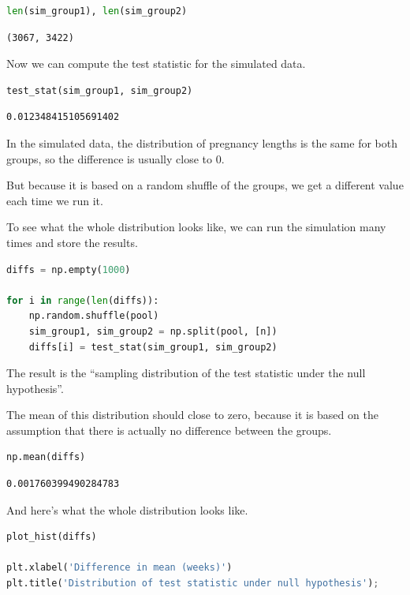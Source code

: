 \begin{lstlisting}[language=Python,style=source]
len(sim_group1), len(sim_group2)
\end{lstlisting}

\begin{lstlisting}[style=output]
(3067, 3422)
\end{lstlisting}

Now we can compute the test statistic for the simulated data.

\begin{lstlisting}[language=Python,style=source]
test_stat(sim_group1, sim_group2)
\end{lstlisting}

\begin{lstlisting}[style=output]
0.012348415105691402
\end{lstlisting}

In the simulated data, the distribution of pregnancy lengths is the same
for both groups, so the difference is usually close to 0.

But because it is based on a random shuffle of the groups, we get a
different value each time we run it.

To see what the whole distribution looks like, we can run the simulation
many times and store the results.

\begin{lstlisting}[language=Python,style=source]
diffs = np.empty(1000)

for i in range(len(diffs)):
    np.random.shuffle(pool)
    sim_group1, sim_group2 = np.split(pool, [n])
    diffs[i] = test_stat(sim_group1, sim_group2)
\end{lstlisting}

The result is the ``sampling distribution of the test statistic under
the null hypothesis''.

The mean of this distribution should close to zero, because it is based
on the assumption that there is actually no difference between the
groups.

\begin{lstlisting}[language=Python,style=source]
np.mean(diffs)
\end{lstlisting}

\begin{lstlisting}[style=output]
0.001760399490284783
\end{lstlisting}

And here's what the whole distribution looks like.

\begin{lstlisting}[language=Python,style=source]
plot_hist(diffs)

plt.xlabel('Difference in mean (weeks)')
plt.title('Distribution of test statistic under null hypothesis');
\end{lstlisting}


